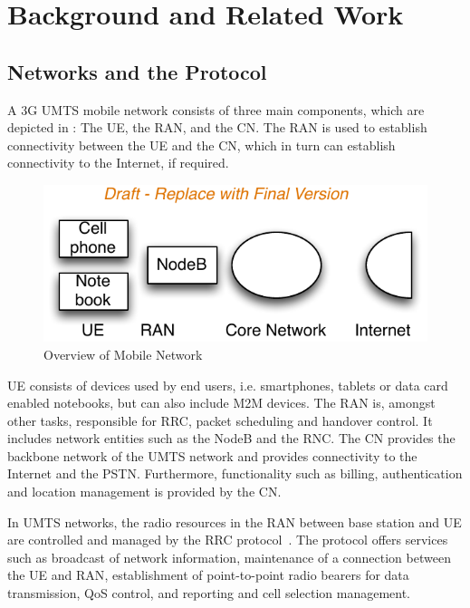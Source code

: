 \section{Background and Related Work}\label{sec:network:background}

\subsection{ Networks and the  Protocol}\label{sec:network:background:umts_rrc}
A \gls{3G} \gls{UMTS} mobile network consists of three main components, which are depicted in : The \gls{UE}, the \gls{RAN}, and the \gls{CN}.
The \gls{RAN} is used to establish connectivity between the \gls{UE} and the \gls{CN}, which in turn can establish connectivity to the Internet, if required.

\begin{figure}
	\centering
	\includegraphics{network/background/figures/mobile_network_overview}
	\caption{Overview of Mobile Network}
	\label{fig:network:background:mobile_network_overview}
\end{figure}

\gls{UE} consists of devices used by end users, i.e. smartphones, tablets or data card enabled notebooks, but can also include \gls{M2M} devices.
The \gls{RAN} is, amongst other tasks, responsible for \gls{RRC}, packet scheduling and handover control.
It includes network entities such as the \gls{NodeB} and the \gls{RNC}.
The \gls{CN} provides the backbone network of the \gls{UMTS} network and provides connectivity to the Internet and the \gls{PSTN}.
Furthermore, functionality such as billing, authentication and location management is provided by the \gls{CN}.

In UMTS networks, the radio resources in the RAN between base station and UE are controlled and managed by the \gls{RRC} protocol~\cite{3GPP_RRC_Spec}.
The protocol offers services such as broadcast of network information, maintenance of a connection between the \gls{UE} and \gls{RAN}, establishment of point-to-point radio bearers for data transmission, \gls{QoS} control, and reporting and cell selection management.


